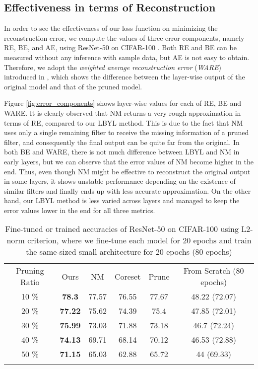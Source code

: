\subsection{Effectiveness in terms of Reconstruction}
In order to see the effectiveness of our loss function on minimizing the reconstruction error, we compute the values of three error components, namely RE, BE, and AE, using ResNet-50 \cite{ResNet} on CIFAR-100 \cite{krizhevsky2009learning}. Both RE and BE can be measured without any inference with sample data, but AE is not easy to obtain. Therefore, we adopt the \textit{weighted average reconstruction error} (\textit{WARE}) introduced in \cite{NISP}, which shows the difference between the layer-wise output of the original model and that of the pruned model.

Figure \ref{fig:error_components} shows layer-wise values for each of RE, BE and WARE. It is clearly observed that NM returns a very rough approximation in terms of RE, compared to our LBYL method. This is due to the fact that NM uses only a single remaining filter to receive the missing information of a pruned filter, and consequently the final output can be quite far from the original.
In both BE and WARE, there is not much difference between LBYL and NM in early layers, but we can observe that the error values of NM become higher in the end. Thus, even though NM might be effective to reconstruct the original output in some layers, it shows unstable performance depending on the existence of similar filters and finally ends up with less accurate approximation. On the other hand, our LBYL method is less varied across layers and managed to keep the error values lower in the end for all three metrics.

\begin{table}[t]
\centering
\tiny
\begin{tabular}{c||c|c|c|c|c} \Xhline{2\arrayrulewidth}
Pruning Ratio& Ours & NM& Coreset&Prune & From Scratch (80 epochs) \\ \Xhline{2\arrayrulewidth}
10 \% & \textbf{78.3}   & 77.57  &76.55 & 77.67  & 48.22 (72.07)\\\hline
20 \% & \textbf{77.22}  &  75.62  &74.39&  75.4   & 47.85 (72.01)\\\hline 
30 \% & \textbf{75.99}  & 73.03  &71.88&  73.18  & 46.7 (72.24)\\\hline
40 \% & \textbf{74.13}  & 69.71  &68.14&  70.12  & 46.53 (72.88)\\\hline
50 \% & \textbf{71.15}  & 65.03  &62.88&  65.72  & 44 (69.33)\\\Xhline{2\arrayrulewidth}
\end{tabular}
\caption{Fine-tuned or trained accuracies of ResNet-50 on CIFAR-100 using L2-norm criterion, where we fine-tune each model for 20 epochs and train the same-sized small architecture for 20 epochs (80 epochs)}
\label{tab:finetune_scratch}
\vspace{-3mm}
\end{table}

